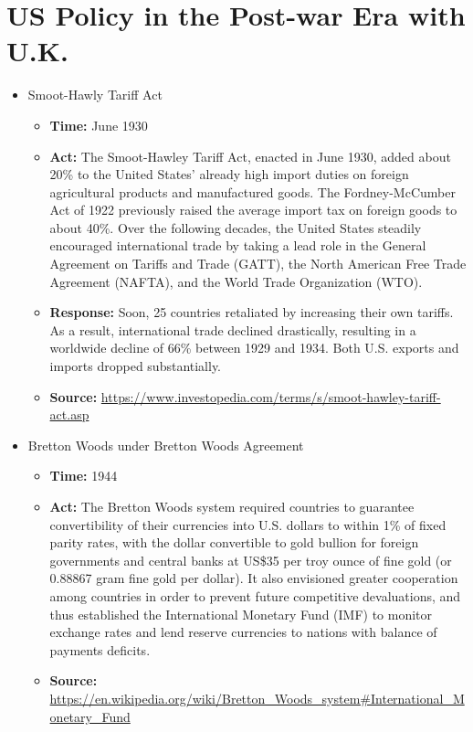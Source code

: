 \section{US Policy in the Post-war Era with U.K.}
		\begin{itemize}
		\item	Smoot-Hawly Tariff Act
			\begin{itemize}
			\item \textbf{Time: }June 1930
			\item \textbf{Act: }The Smoot-Hawley Tariff Act, enacted in June 1930, added about 20\% to the United States' already high import duties on foreign agricultural products and manufactured goods. The Fordney-McCumber Act of 1922 previously raised the average import tax on foreign goods to about 40\%.
			Over the following decades, the United States steadily encouraged international trade by taking a lead role in the General Agreement on Tariffs and Trade (GATT), the North American Free Trade Agreement (NAFTA), and the World Trade Organization (WTO).
			\item \textbf{Response: }Soon, 25 countries retaliated by increasing their own tariffs. As a result, international trade declined drastically, resulting in a worldwide decline of 66\% between 1929 and 1934. Both U.S. exports and imports dropped substantially.
			\item	\textbf{Source: }\url{https://www.investopedia.com/terms/s/smoot-hawley-tariff-act.asp}
			\end{itemize}
		
		\item Bretton Woods under Bretton Woods Agreement
			\begin{itemize}
			\item \textbf{Time: } 1944
			\item \textbf{Act: }The Bretton Woods system required countries to guarantee convertibility of their currencies into U.S. dollars to within 1\% of fixed parity rates, with the dollar convertible to gold bullion for foreign governments and central banks at US\$35 per troy ounce of fine gold (or 0.88867 gram fine gold per dollar). It also envisioned greater cooperation among countries in order to prevent future competitive devaluations, and thus established the International Monetary Fund (IMF) to monitor exchange rates and lend reserve currencies to nations with balance of payments deficits.
			\item	\textbf{Source: }\url{https://en.wikipedia.org/wiki/Bretton_Woods_system#International_Monetary_Fund}
			\end{itemize}


\end{itemize}
